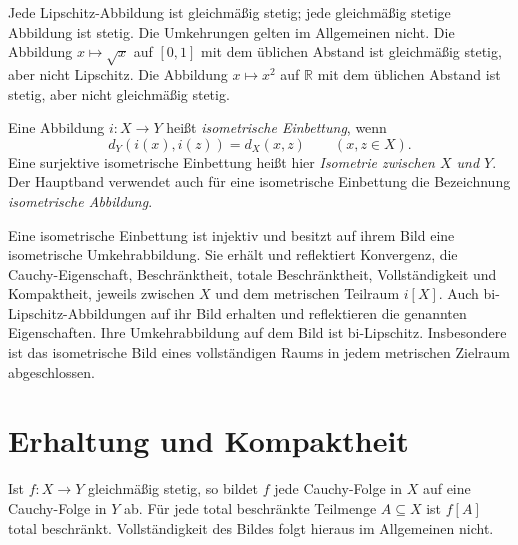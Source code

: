 \begin{theorem}
\label{b47guide:thm:continuity-hierarchy}
Jede Lipschitz-Abbildung ist gleichmäßig stetig; jede gleichmäßig
stetige Abbildung ist stetig. Die Umkehrungen gelten im Allgemeinen
nicht. Die Abbildung $x\mapsto\sqrt{x}$ auf $[0,1]$ mit dem üblichen
Abstand ist gleichmäßig stetig, aber nicht Lipschitz.
Die Abbildung $x\mapsto x^2$ auf $\mathbb R$ mit dem üblichen Abstand
ist stetig, aber nicht gleichmäßig stetig.
\end{theorem}

\begin{definition}
\label{b47guide:def:isometry}
Eine Abbildung $i:X\to Y$ heißt \emph{isometrische Einbettung}, wenn
\[
 d_Y(i(x),i(z))=d_X(x,z)\qquad(x,z\in X).
\]
Eine surjektive isometrische Einbettung heißt hier \emph{Isometrie
zwischen $X$ und $Y$}. Der Hauptband verwendet auch für eine
isometrische Einbettung die Bezeichnung \emph{isometrische Abbildung}.
\end{definition}

\begin{theorem}
\label{b47guide:thm:metric-invariants}
Eine isometrische Einbettung ist injektiv und besitzt auf ihrem
Bild eine isometrische Umkehrabbildung. Sie erhält und reflektiert
Konvergenz, die Cauchy-Eigenschaft, Beschränktheit, totale
Beschränktheit, Vollständigkeit und Kompaktheit, jeweils zwischen
$X$ und dem metrischen Teilraum $i[X]$.
Auch bi-Lipschitz-Abbildungen auf ihr Bild erhalten und reflektieren
die genannten Eigenschaften. Ihre Umkehrabbildung auf dem Bild ist
bi-Lipschitz.
Insbesondere ist das isometrische Bild eines vollständigen Raums
in jedem metrischen Zielraum abgeschlossen.
\end{theorem}

\section{Erhaltung und Kompaktheit}

\begin{theorem}
\label{b47guide:thm:uniform-preservation}
Ist $f:X\to Y$ gleichmäßig stetig, so bildet $f$ jede Cauchy-Folge
in $X$ auf eine Cauchy-Folge in $Y$ ab. Für jede total beschränkte
Teilmenge $A\subseteq X$ ist $f[A]$ total beschränkt.
Vollständigkeit des Bildes folgt hieraus im Allgemeinen nicht.
\cite{metric-notes}
\end{theorem}

